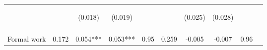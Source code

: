 \begin{tabular}{lccccccccc}
 & \begin{footnotesize}\end{footnotesize} & \begin{footnotesize}(0.018)\end{footnotesize} & \begin{footnotesize}(0.019)\end{footnotesize} & \begin{footnotesize}\end{footnotesize} & \begin{footnotesize}\end{footnotesize} & \begin{footnotesize}(0.025)\end{footnotesize} & \begin{footnotesize}(0.028)\end{footnotesize} & \begin{footnotesize}\end{footnotesize} & \begin{footnotesize}\end{footnotesize}\\
 & \begin{footnotesize}\end{footnotesize} & \begin{footnotesize}[0.215]\end{footnotesize} & \begin{footnotesize}[0.004]\end{footnotesize} & \begin{footnotesize}\end{footnotesize} & \begin{footnotesize}\end{footnotesize} & \begin{footnotesize}[0.411]\end{footnotesize} & \begin{footnotesize}[1.000]\end{footnotesize} & \begin{footnotesize}\end{footnotesize} & \begin{footnotesize}\end{footnotesize}\\
\noalign{\smallskip}Formal work & 0.172 & 0.054*** & 0.053*** & 0.95 & 0.259 & -0.005 & -0.007 & 0.96 & \\

\end{tabular}
